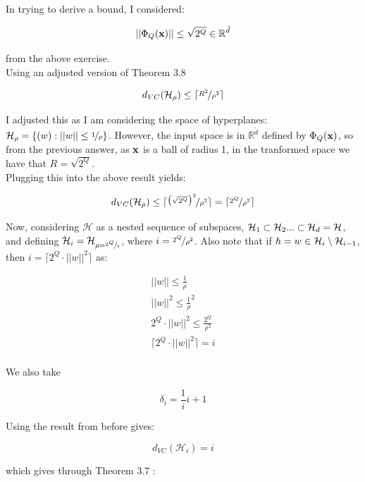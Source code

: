 \documentclass{scrartcl}
\begin{document}
\subsection{}

In trying to derive a bound, I considered:

\[
|| \Phi_Q({\mathbf x}) || \leq \sqrt{ 2^Q } \in \mathbb{R}^{\tilde{d}}
\]

from the above exercise.\\

Using an adjusted version of Theorem 3.8 \cite[p. 18]{mln}

\[ d_{VC} (\mathcal{H}_\rho) \leq \lceil \nicefrac{R^2} {\rho^2} \rceil \]

I adjusted this as I am considering the space of hyperplanes: $ \mathcal{H}_\rho = \{ (w) : || w || \leq \nicefrac {1} {\rho} \}$. However, the input space is in $\mathbb{R}^{\tilde{d}}$ defined by $\Phi_Q ({\mathbf x})$, so from the previous answer, as ${\mathbf x}$ is a ball of radius 1, in the tranformed space we have that $R = \sqrt{ 2^Q }$.\\

Plugging this into the above result yields:

\[ d_{VC} (\mathcal{H}_\rho) \leq \lceil \nicefrac { \big( \sqrt{ 2^Q } \big) ^2 } { \rho^2 } \rceil = \lceil \nicefrac{2^Q} {\rho^2} \rceil \]

Now, considering $\mathcal{H}$ as a nested sequence of subspaces, ${\mathcal{H}}_1 \subset {\mathcal{H}}_2 ... \subset {\mathcal{H}}_d = {\mathcal{H}}$, and defining ${\mathcal{H}}_i = {\mathcal{H}}_{\rho = \nicefrac {2^Q} {i}}$, where $i = \nicefrac {2^Q} {\rho^2}$. Also note that if $h = w \in {\mathcal{H}}_i \setminus {\mathcal{H}}_{i-1}$,
then $i = \lceil 2^Q \cdot || w ||^2 \rceil $ as:

\begin{align*}
    || w || \leq \frac {1} {\rho} \\
    || w ||^2 \leq \frac {1} {\rho}^2 \\
    2^Q \cdot || w ||^2 \leq \frac {2^Q} {\rho^2} \\
    \lceil 2^Q \cdot || w ||^2 \rceil = i \\
\end{align*}

We also take

\[
    \delta_i = \frac {1} {i}{i+1}
\]

Using the result from before gives:

\[ d_{VC} (\mathcal{H}_i) = i\]

which gives through Theorem 3.7 \cite[p.18]{mln}:
\end{document}
